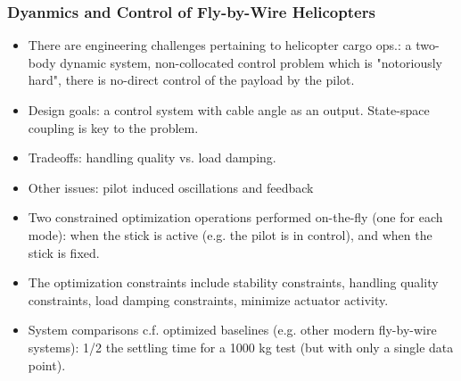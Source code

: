 \documentclass{article}
\begin{document}
\subsubsection{Dyanmics and Control of Fly-by-Wire Helicopters}
\begin{itemize}
\item There are engineering challenges pertaining to helicopter cargo ops.: a two-body dynamic system, non-collocated control problem which is "notoriously hard", there is no-direct control of the payload by the pilot.
\item Design goals: a control system with cable angle as an output. State-space coupling is key to the problem.
\item Tradeoffs: handling quality vs. load damping.
\item Other issues: pilot induced oscillations and feedback
\item Two constrained optimization operations performed on-the-fly (one for each mode): when the stick is active (e.g. the pilot is in control), and when the stick is fixed.
\item The optimization constraints include stability constraints, handling quality constraints, load damping constraints, minimize actuator activity.
\item System comparisons c.f. optimized baselines (e.g. other modern fly-by-wire systems): 1/2 the settling time for a 1000 kg test (but with only a single data point).
\end{itemize}
\end{document}
